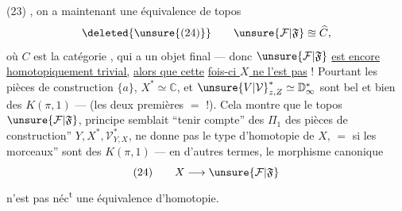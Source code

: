 \noindent (23)
,
on a maintenant une équivalence de topos
\[
\deleted{\unsure{(24)}}\qquad \unsure{\mathcal F|\mathfrak F}\approxeq\widehat C,
\]
où $C$ est la catégorie \diagram{\begin{tikzcd}[column sep=small]\bullet\arrow[r]&\bullet\end{tikzcd}}, qui a
un objet final --- donc $\unsure{\mathcal F|\mathfrak F}$ \uline{est encore}
\uline{homotopiquement trivial,} \uline{alors que cette}
\uline{fois-ci $X$ ne l'est pas} ! Pourtant les
pièces de construction $\{a\}$, $X^*\simeq\mathbb C$, et
$\unsure{V|\mathcal V}^*_{z,Z}\simeq\mathbb D^*_{\infty}$ sont bel et bien des $K(\pi,1)$ ---
(les deux premières $=$  !). Cela
montre que le topos $\unsure{\mathcal F|\mathfrak F}$, 
principe semblait ``tenir compte'' des
$\Pi_1$ des pièces de construction'' $Y,X^*,\mathcal V^*_{Y,X}$,
ne donne pas  le type d'homotopie
de $X$, $=$ si les morceaux'' sont des
$K(\pi,1)$ --- en d'autres termes, le
morphisme canonique
\[
(24)\qquad X\longrightarrow\unsure{\mathcal F|\mathfrak F}
\]
n'est pas néc\textsuperscript{t} une équivalence d'homotopie.

